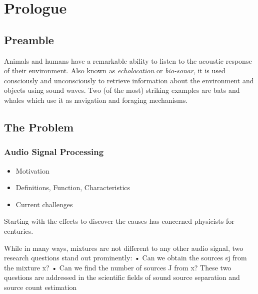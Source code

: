 \chapter{Prologue}\label{chap:intro}


\section{Preamble}
Animals and humans have a remarkable ability to listen to the acoustic response of their environment.
Also known as \emph{echolocation} or \emph{bio-sonar}, it is used consciously and unconsciously to retrieve
information about the environment and objects using sound waves.
Two (of the most) striking examples are bats and whales which use it as navigation and foraging mechanisms.



\section{The Problem}\label{sec:intro:problem}
\subsection{Audio Signal Processing}
\begin{itemize}
    \item Motivation
    \item Definitions, Function, Characteristics
    \item Current challenges
\end{itemize}
Starting with the effects to discover the causes has concerned physicists for centuries.

While in many ways, mixtures are not different to any other audio signal, two research questions stand out prominently: • Can we obtain the sources sj from the mixture x? • Can we find the number of sources J from x? These two questions are addressed in the scientific fields of sound
source separation and source count estimation



